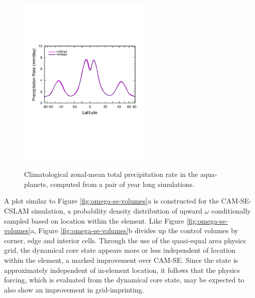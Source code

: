 \documentclass[twocol]{ametsoc}
\begin{document}
\begin{figure}[t]
\begin{center}
\noindent\includegraphics[width=15pc,angle=0]{figs/temp_dzonal.pdf}\\
\end{center}
\caption{Climatological zonal-mean total precipitation rate in the aqua-planets, computed from a pair of year long simulations.}
\label{fig:zonal}
\end{figure}

A plot similar to Figure \ref{fig:omega-se-volumes}a is constructed for the CAM-SE-CSLAM simulation, a probability density distribution of upward $\omega$ conditionally sampled based on location within the element. {\color{red}Like Figure \ref{fig:omega-se-volumes}a, Figure \ref{fig:omega-se-volumes}b divides up the control volumes by corner, edge and interior cells. Through the use of the quasi-equal area physics grid, the dynamical core state appears more or less independent of location within the element, a marked improvement over CAM-SE. Since the state is approximately independent of in-element location, it follows that the physics forcing, which is evaluated from the dynamical core state, may be expected to also show an improvement in grid-imprinting.{}} 
\end{document}
